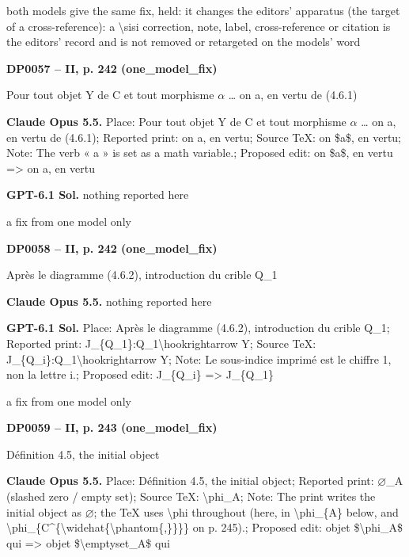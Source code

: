 both models give the same fix, held: it changes the editors' apparatus (the target of a cross-reference): a \textbackslash{}sisi correction, note, label, cross-reference or citation is the editors' record and is not removed or retargeted on the models' word\par
\par\noindent\hypertarget{DP0057}{}\textbf{DP0057 -- II, p. 242 (one\_model\_fix)}\par
Pour tout objet Y de C et tout morphisme \ensuremath{\alpha} … on a, en vertu de (4.6.1)\par
\textbf{Claude Opus 5.5.} Place: Pour tout objet Y de C et tout morphisme \ensuremath{\alpha} … on a, en vertu de (4.6.1); Reported print: on a, en vertu; Source TeX: on \$a\$, en vertu; Note: The verb « a » is set as a math variable.; Proposed edit: on \$a\$, en vertu =\allowbreak > on a, en vertu\par
\textbf{GPT-6.1 Sol.} nothing reported here\par
a fix from one model only\par
\par\noindent\hypertarget{DP0058}{}\textbf{DP0058 -- II, p. 242 (one\_model\_fix)}\par
Après le diagramme (4.6.2), introduction du crible Q\_1\par
\textbf{Claude Opus 5.5.} nothing reported here\par
\textbf{GPT-6.1 Sol.} Place: Après le diagramme (4.6.2), introduction du crible Q\_1; Reported print: J\_\{Q\_1\}:Q\_1\textbackslash{}hookrightarrow Y; Source TeX: J\_\{Q\_i\}:Q\_1\textbackslash{}hookrightarrow Y; Note: Le sous-indice imprimé est le chiffre 1, non la lettre i.; Proposed edit: J\_\{Q\_i\} =\allowbreak > J\_\{Q\_1\}\par
a fix from one model only\par
\par\noindent\hypertarget{DP0059}{}\textbf{DP0059 -- II, p. 243 (one\_model\_fix)}\par
Définition 4.5, the initial object\par
\textbf{Claude Opus 5.5.} Place: Définition 4.5, the initial object; Reported print: \ensuremath{\varnothing}\_A (slashed zero / empty set); Source TeX: \textbackslash{}phi\_A; Note: The print writes the initial object as \ensuremath{\varnothing}; the TeX uses \textbackslash{}phi throughout (here, in \textbackslash{}phi\_\{A\} below, and \textbackslash{}phi\_\{C\textasciicircum{}\{\textbackslash{}widehat\{\textbackslash{}phantom\{,\}\}\}\} on p. 245).; Proposed edit: objet \$\textbackslash{}phi\_A\$ qui =\allowbreak > objet \$\textbackslash{}emptyset\_A\$ qui\par
